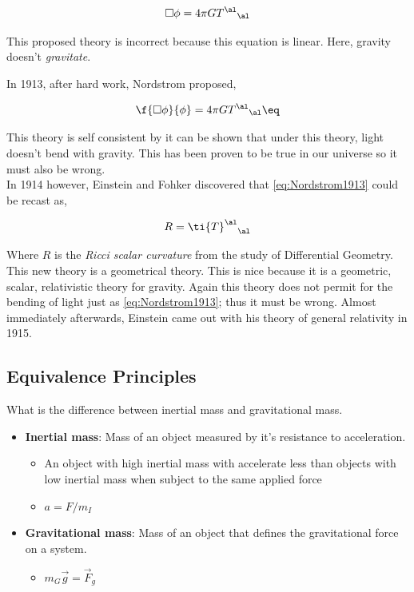 \documentclass{article}
\begin{document}
\[ \Box \phi = 4 \pi G {T^{\al}}_{\al} \]

This proposed theory is incorrect because this equation is linear. Here, gravity doesn't \textit{gravitate}.

In 1913, after hard work, Nordstrom proposed,

\[ \f{\Box \phi}{\phi} = 4 \pi G {T^{\al}}_{\al} \eq \label{eq:Nordstrom1913}\]

This theory is self consistent by it can be shown that under this theory, light doesn't bend with gravity. This has been proven to be true in our universe so it must also be wrong. \\

In 1914 however, Einstein and Fohker discovered that \eqref{eq:Nordstrom1913} could be recast as,

\[ R = {\ti{T}^{\al}}_\al \]

Where $R$ is the \textit{Ricci scalar curvature} from the study of Differential Geometry. This new theory is a geometrical theory. This is nice because it is a geometric, scalar, relativistic theory for gravity. Again this theory does not permit for the bending of light just as \eqref{eq:Nordstrom1913}; thus it must be wrong. Almost immediately afterwards, Einstein came out with his theory of general relativity in 1915.

\subsection{Equivalence Principles}

What is the difference between inertial mass and gravitational mass.

\begin{itemize}
    \item \textbf{Inertial mass}: Mass of an object measured by it's resistance to acceleration.
    \begin{itemize}
        \item An object with high inertial mass with accelerate less than objects with low inertial mass when subject to the same applied force
        \item $a = F / m_I$
    \end{itemize}
    \item \textbf{Gravitational mass}: Mass of an object that defines the gravitational force on a system.
    \begin{itemize}
        \item $m_G \vec{g} = \vec{F}_g$
    \end{itemize}
\end{itemize}
\end{document}
